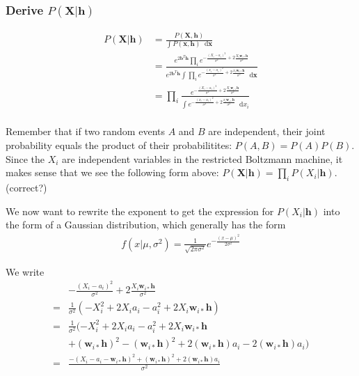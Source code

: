 \documentclass[norsk,a4paper,11pt]{article}
\newcommand*\diff{\mathop{}\!\mathrm{d}}
\newcommand{\VX}{\mathbf{X}}
\newcommand{\Vx}{\mathbf{x}}
\newcommand{\Vh}{\mathbf{h}}
\newcommand{\Vwi}{\mathbf{w}_{i*}}
\newcommand{\Vb}{\mathbf{b}}
\begin{document}
\subsubsection{Derive $P(\VX | \Vh)$}

\begin{align}
	P(\VX | \Vh) &= \frac{P(\VX, \Vh)}{\int P(\Vx, \Vh) \diff \Vx} \\
	&= \frac{e^{2\Vb^T \Vh} \prod_i e^{-\frac{(X_i - a_i)^2}{\sigma^2} + 2\frac{X_i \Vwi \Vh}{\sigma^2}}}{e^{2\Vb^T \Vh} \int \prod_i e^{-\frac{(x_i - a_i)^2}{\sigma^2} + 2\frac{x_i \Vwi \Vh}{\sigma^2}} \diff \Vx } \\
	&= \prod_i \frac{e^{-\frac{(X_i - a_i)^2}{\sigma^2} + 2\frac{X_i \Vwi \Vh}{\sigma^2}}}{\int e^{-\frac{(x_i - a_i)^2}{\sigma^2} + 2\frac{x_i \Vwi \Vh}{\sigma^2}} \diff x_i } \\
\end{align}

Remember that if two random events $A$ and $B$ are independent, their joint probability equals the product of their probabilitites: $P(A, B) = P(A)P(B)$. Since the $X_i$ are independent variables in the restricted Boltzmann machine, it makes sense that we see the following form above: $P(\VX | \Vh) = \prod_i P(X_i | \Vh) $. (correct?)

We now want to rewrite the exponent to get the expression for $P(X_i | \Vh)$ into the form of a Gaussian distribution, which generally has the form
\begin{align}
	f(x|\mu, \sigma^2) = \frac{1}{\sqrt{2\pi \sigma^2}} e^{-\frac{(x-\mu)^2}{2\sigma^2}}
\end{align}

We write
\begin{align}
	&-\frac{(X_i - a_i)^2}{\sigma^2} + 2\frac{X_i \Vwi \Vh}{\sigma^2} \\
	= & \frac{1}{\sigma^2}(-X_i^2 + 2X_i a_i - a_i^2 + 2X_i \Vwi \Vh) \\
	= & \frac{1}{\sigma^2}(-X_i^2 + 2X_i a_i - a_i^2 + 2X_i \Vwi  \Vh \\ &+ (\Vwi  \Vh)^2 - (\Vwi \Vh)^2 + 2(\Vwi  \Vh)a_i - 2(\Vwi  \Vh)a_i )\\
	=& \frac{-(X_i - a_i- \Vwi \Vh)^2 + (\Vwi  \Vh)^2 + 2(\Vwi \Vh)a_i}{\sigma^2}
\end{align}
\end{document}
